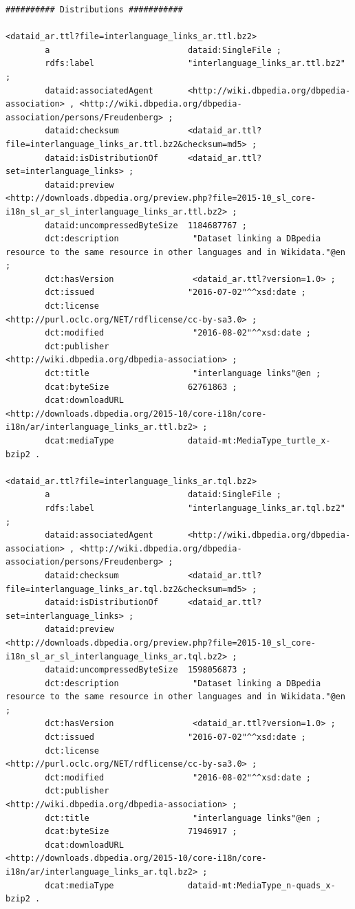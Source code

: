 \documentclass[a4paper,english,twoside,BCOR1.5cm,headsepline,DIV12,appendixprefix,final,12pt]{scrbook}
\begin{document}
\begin{lstlisting}[language=ttl, captionpos=b, label=lst:dcex,linewidth=\columnwidth,breaklines=true,basicstyle=\ttfamily\scriptsize]
########## Distributions ###########

<dataid_ar.ttl?file=interlanguage_links_ar.ttl.bz2>
        a                            dataid:SingleFile ;
        rdfs:label                   "interlanguage_links_ar.ttl.bz2" ;
        dataid:associatedAgent       <http://wiki.dbpedia.org/dbpedia-association> , <http://wiki.dbpedia.org/dbpedia-association/persons/Freudenberg> ;
        dataid:checksum              <dataid_ar.ttl?file=interlanguage_links_ar.ttl.bz2&checksum=md5> ;
        dataid:isDistributionOf      <dataid_ar.ttl?set=interlanguage_links> ;
        dataid:preview               <http://downloads.dbpedia.org/preview.php?file=2015-10_sl_core-i18n_sl_ar_sl_interlanguage_links_ar.ttl.bz2> ;
        dataid:uncompressedByteSize  1184687767 ;
        dct:description               "Dataset linking a DBpedia resource to the same resource in other languages and in Wikidata."@en ;
        dct:hasVersion                <dataid_ar.ttl?version=1.0> ;
        dct:issued                   "2016-07-02"^^xsd:date ;
        dct:license                   <http://purl.oclc.org/NET/rdflicense/cc-by-sa3.0> ;
        dct:modified                  "2016-08-02"^^xsd:date ;
        dct:publisher                 <http://wiki.dbpedia.org/dbpedia-association> ;
        dct:title                     "interlanguage links"@en ;
        dcat:byteSize                62761863 ;
        dcat:downloadURL             <http://downloads.dbpedia.org/2015-10/core-i18n/core-i18n/ar/interlanguage_links_ar.ttl.bz2> ;
        dcat:mediaType               dataid-mt:MediaType_turtle_x-bzip2 .

<dataid_ar.ttl?file=interlanguage_links_ar.tql.bz2>
        a                            dataid:SingleFile ;
        rdfs:label                   "interlanguage_links_ar.tql.bz2" ;
        dataid:associatedAgent       <http://wiki.dbpedia.org/dbpedia-association> , <http://wiki.dbpedia.org/dbpedia-association/persons/Freudenberg> ;
        dataid:checksum              <dataid_ar.ttl?file=interlanguage_links_ar.tql.bz2&checksum=md5> ;
        dataid:isDistributionOf      <dataid_ar.ttl?set=interlanguage_links> ;
        dataid:preview               <http://downloads.dbpedia.org/preview.php?file=2015-10_sl_core-i18n_sl_ar_sl_interlanguage_links_ar.tql.bz2> ;
        dataid:uncompressedByteSize  1598056873 ;
        dct:description               "Dataset linking a DBpedia resource to the same resource in other languages and in Wikidata."@en ;
        dct:hasVersion                <dataid_ar.ttl?version=1.0> ;
        dct:issued                   "2016-07-02"^^xsd:date ;
        dct:license                   <http://purl.oclc.org/NET/rdflicense/cc-by-sa3.0> ;
        dct:modified                  "2016-08-02"^^xsd:date ;
        dct:publisher                 <http://wiki.dbpedia.org/dbpedia-association> ;
        dct:title                     "interlanguage links"@en ;
        dcat:byteSize                71946917 ;
        dcat:downloadURL             <http://downloads.dbpedia.org/2015-10/core-i18n/core-i18n/ar/interlanguage_links_ar.tql.bz2> ;
        dcat:mediaType               dataid-mt:MediaType_n-quads_x-bzip2 .


\end{lstlisting}
\end{document}
